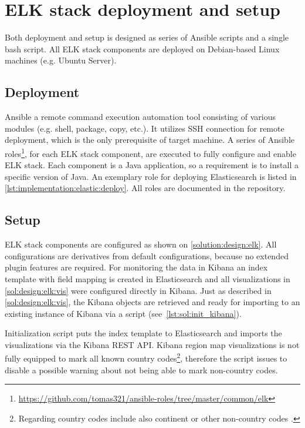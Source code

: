 \documentclass[12pt,a4paper,twoside]{report}
\begin{document}
	\section{ELK stack deployment and setup} \label{implementation:elk}
		Both deployment and setup is designed as series of Ansible scripts and a single bash script. All ELK stack components are deployed on Debian-based Linux machines (e.g. Ubuntu Server).
		\subsection{Deployment} \label{implementation:elk:deploy}
			Ansible a remote command execution automation tool consisting of various modules (e.g. shell, package, copy, etc.). It utilizes SSH connection for remote deployment, which is the only prerequisite of target machine. A series of Ansible roles\footnote{\url{https://github.com/tomas321/ansible-roles/tree/master/common/elk}}, for each ELK stack component, are executed to fully configure and enable ELK stack. Each component is a Java application, so a requirement is to install a specific version of Java. An exemplary role for deploying Elasticsearch is listed in \autoref{lst:implementation:elastic:deploy}. All roles are documented in the repository.
			
		\subsection{Setup} \label{implementation:elk:setup}
			ELK stack components are configured as shown on \autoref{solution:design:elk}. All configurations are derivatives from default configurations, because no extended plugin features are required. For monitoring the data in Kibana an index template with field mapping is created in Elasticsearch and all visualizations in \autoref{sol:design:elk:vis} were configured directly in Kibana. Just as described in \autoref{sol:design:elk:vis}, the Kibana objects are retrieved and ready for importing to an existing instance of Kibana via a script (see~\autoref{lst:sol:init_kibana}).
			
			Initialization script puts the index template to Elasticsearch and imports the visualizations via the Kibana REST API. Kibana region map visualizations is not fully equipped to mark all known country codes\footnote{Regarding country codes include also continent or other non-country codes \cite{geoip:country_codes}.}, therefore the script issues to disable a possible warning about not being able to mark non-country codes.
\end{document}

